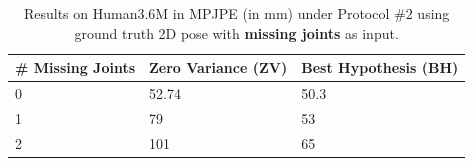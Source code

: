 \begin{table}[htb!]
    \centering
    \begin{tabularx}{\linewidth}{XXX}%
        \toprule
        \# Missing Joints & Zero Variance (ZV) & Best Hypothesis (BH)\\
        \midrule \midrule
        0                 & 52.74         & 50.3            \\
        1                 & 79            & 53              \\
        2                 & 101           & 65              \\
        \bottomrule
    \end{tabularx}
    \caption{Results on Human3.6M in MPJPE (in mm) under Protocol $\#2$ using ground truth 2D pose with \textbf{missing joints} as input.}
    \label{table:missing_joints}
    \vspace{-3ex}
\end{table}